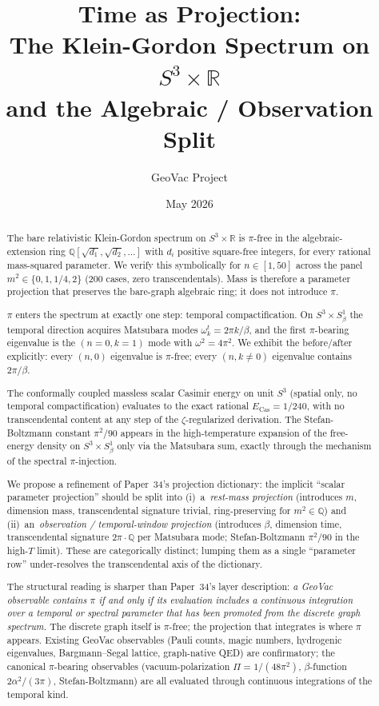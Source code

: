 \documentclass[11pt]{article}
\title{Time as Projection:\\
The Klein-Gordon Spectrum on $S^3 \times \mathbb{R}$\\
and the Algebraic / Observation Split}
\author{GeoVac Project}
\date{May 2026}
\begin{document}
\maketitle

\begin{abstract}
The bare relativistic Klein-Gordon spectrum on $S^3 \times \mathbb{R}$
is $\pi$-free in the algebraic-extension ring
$\mathbb{Q}[\sqrt{d_1}, \sqrt{d_2}, \ldots]$ with $d_i$ positive
square-free integers, for every rational mass-squared parameter.  We
verify this symbolically for $n \in [1, 50]$ across the panel
$m^2 \in \{0, 1, 1/4, 2\}$ (200 cases, zero transcendentals).  Mass is
therefore a parameter projection that preserves the bare-graph algebraic
ring; it does not introduce $\pi$.

$\pi$ enters the spectrum at exactly one step: temporal compactification.
On $S^3 \times S^1_\beta$ the temporal direction acquires Matsubara modes
$\omega^t_k = 2\pi k / \beta$, and the first $\pi$-bearing eigenvalue is
the $(n{=}0, k{=}1)$ mode with $\omega^2 = 4\pi^2$.  We exhibit the
before/after explicitly: every $(n, 0)$ eigenvalue is $\pi$-free; every
$(n, k {\neq} 0)$ eigenvalue contains $2\pi/\beta$.

The conformally coupled massless scalar Casimir energy on unit $S^3$
(spatial only, no temporal compactification) evaluates to the exact
rational $E_\text{Cas} = 1/240$, with no transcendental content at any
step of the $\zeta$-regularized derivation.  The Stefan-Boltzmann
constant $\pi^2/90$ appears in the high-temperature expansion of the
free-energy density on $S^3 \times S^1_\beta$ only via the Matsubara
sum, exactly through the mechanism of the spectral $\pi$-injection.

We propose a refinement of Paper~34's projection dictionary: the
implicit ``scalar parameter projection'' should be split into
(i)~a~\emph{rest-mass projection} (introduces $m$, dimension mass,
transcendental signature trivial, ring-preserving for $m^2 \in
\mathbb{Q}$) and (ii)~an~\emph{observation / temporal-window projection}
(introduces $\beta$, dimension time, transcendental signature
$2\pi \cdot \mathbb{Q}$ per Matsubara mode; Stefan-Boltzmann
$\pi^2/90$ in the high-$T$ limit).  These are categorically distinct;
lumping them as a single ``parameter row'' under-resolves the
transcendental axis of the dictionary.

The structural reading is sharper than Paper~34's layer description:
\emph{a GeoVac observable contains $\pi$ if and only if its evaluation
includes a continuous integration over a temporal or spectral parameter
that has been promoted from the discrete graph spectrum.}  The discrete
graph itself is $\pi$-free; the projection that integrates is where
$\pi$ appears.  Existing GeoVac observables (Pauli counts, magic
numbers, hydrogenic eigenvalues, Bargmann--Segal lattice, graph-native
QED) are confirmatory; the canonical $\pi$-bearing observables
(vacuum-polarization $\Pi = 1/(48\pi^2)$, $\beta$-function
$2\alpha^2/(3\pi)$, Stefan-Boltzmann) are all evaluated through
continuous integrations of the temporal kind.


\end{abstract}
\end{document}
